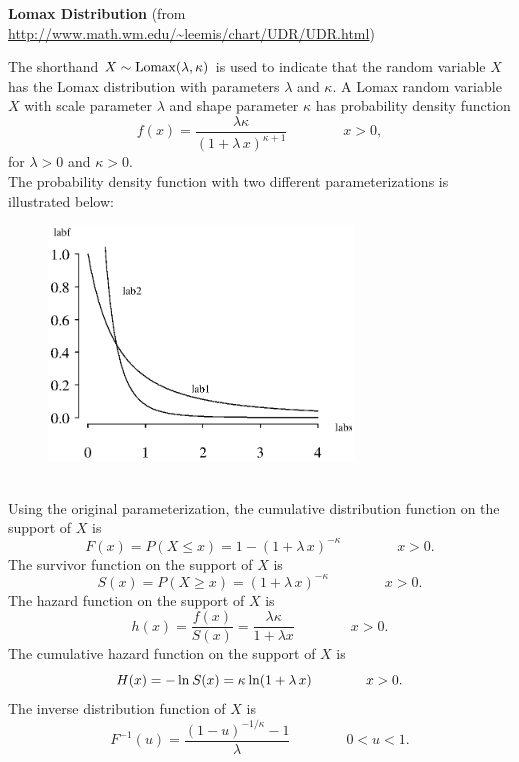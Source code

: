 \documentclass[12pt,fullpage]{article}
\begin{document}
\noindent
{\bf Lomax Distribution} (from \color{blue}\url{http://www.math.wm.edu/~leemis/chart/UDR/UDR.html}\color{black})

\noindent
The shorthand $X \sim {\rm Lomax}(\lambda, \kappa)$ is used to indicate that the
random variable $X$ has the Lomax distribution with parameters $\lambda$ and $\kappa$.
A Lomax random variable $X$ with scale parameter $\lambda$ and shape parameter $\kappa$ 
has probability density function 
$$
f(x) = \frac{\lambda \kappa} {\left( 1 + {\lambda}\,x \right) ^{\kappa + 1}} \qquad \qquad x > 0,
$$  
for $\lambda > 0$ and $\kappa>0$.\\
The probability density function with two different parameterizations is illustrated below:
{\begin{figure}[h!]
\begin{center}
\includegraphics[width=3.2in]{LomaxPlot.ps}
\end{center}
\end{figure}}\\
Using the original parameterization, the cumulative distribution function on
the support of $X$ is
$$
F(x) = P(X \le x) = 1 - \left( 1 + {\lambda}\,x \right) ^ {-{\kappa}}  \qquad  \qquad  x > 0.
$$
The survivor function on the support of $X$ is
$$
S(x) = P(X \ge x) = \left(1 + \lambda\, x\right) ^ {-\kappa}  \qquad \qquad x > 0.
$$
The hazard function on the support of $X$ is
$$
h(x) = \frac{f(x)}{S(x)} = \frac{\lambda \kappa} {1 + \lambda x}  \qquad \qquad x > 0.
$$
The cumulative hazard function on the support of $X$ is
$$
H(x) = - \ln \kern 0.04em S(x) = \kappa \kern 0.04em \ln(1 + \lambda \,x)  \qquad \qquad x > 0.
$$
The inverse distribution function of $X$ is
$$
F ^ {-1}(u) = \frac{\left(1 - u\right) ^ {-1 /  \kappa} - 1}{\lambda}  \qquad \qquad 0 < u < 1.
$$
\end{document}
